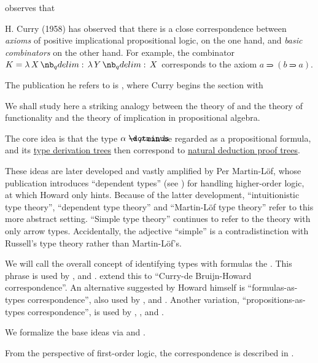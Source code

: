 \begin{concept}\label{con:curry_howard_correspondence}
   observes that
  \begin{displayquote}
    H. Curry (1958) has observed that there is a close correspondence between \textit{axioms} of positive implicational propositional logic, on the one hand, and \textit{basic combinators} on the other hand. For example, the combinator \( K = \qabs X \qabs Y X \) corresponds to the axiom \( a \rightimply (b \rightimply a) \).
  \end{displayquote}

  The publication he refers to is \cite[312]{CurryFeys1958CombinatoryLogic}, where Curry begins the section with
  \begin{displayquote}
    We shall study here a striking analogy between the theory of and the theory of functionality and the theory of implication in propositional algebra.
  \end{displayquote}

  The core idea is that the type \( \alpha \synimplies \rho \) can be regarded as a propositional formula, and its \hyperref[def:type_derivation_tree_tree]{type derivation trees} then correspond to \hyperref[def:natural_deduction_proof_tree]{natural deduction proof trees}.

  These ideas are later developed and vastly amplified by Per Martin-L\"of, whose publication \cite{MartinLöf1975IntTypeTheory} introduces \enquote{dependent types} (see ) for handling higher-order logic, at which Howard only hints. Because of the latter development, \enquote{intuitionistic type theory}, \enquote{dependent type theory} and \enquote{Martin-L\"of type theory} refer to this more abstract setting. \enquote{Simple type theory} continues to refer to the theory with only arrow types. Accidentally, the adjective \enquote{simple} is a contradistinction with Russell's type theory rather than Martin-L\"of's.

  We will call the overall concept of identifying types with formulas the . This phrase is used by ,  and .  extend this to \enquote{Curry-de Bruijn-Howard correspondence}. An alternative suggested by Howard himself is \enquote{formulas-as-types correspondence}, also used by ,  and . Another variation, \enquote{propositions-as-types correspondence}, is used by , ,  and .

  We formalize the base ideas via  and .
\end{concept}
\begin{comments}
  \item From the perspective of first-order logic, the correspondence is described in .
\end{comments}
